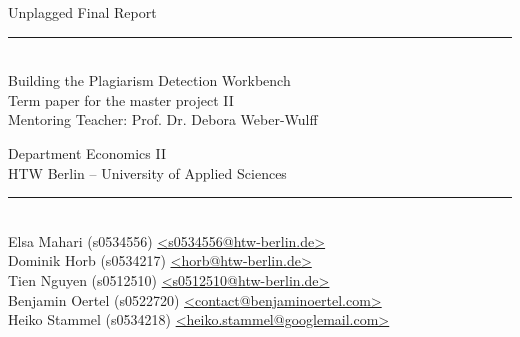 \begin{titlepage}
\vspace*{2cm}

\begin{center}
\Huge
Unplagged Final Report\\
\large
\vspace{0.5cm}
\rule[3mm]{1cm}{0.05mm}\\
Building the Plagiarism Detection Workbench\\
\normalsize
\vfill
Term paper for the master project II \\ Mentoring Teacher: Prof. Dr. Debora Weber-Wulff\\
\vfill

Department Economics II\\
HTW Berlin -- University of Applied Sciences\\

\rule{8.2cm}{0.2mm}\\
Elsa Mahari (s0534556) \href{mailto:s0534556@htw-berlin.de}{\textless s0534556@htw-berlin.de\textgreater}\\
Dominik Horb (s0534217) \href{mailto:horb@htw-berlin.de}{\textless horb@htw-berlin.de\textgreater}\\
Tien Nguyen (s0512510) \href{mailto:s0512510@htw-berlin.de}{\textless s0512510@htw-berlin.de\textgreater}\\
Benjamin Oertel (s0522720) \href{mailto:contact@benjaminoertel.com}{\textless contact@benjaminoertel.com\textgreater}\\
Heiko Stammel (s0534218) \href{mailto:heiko.stammel@googlemail.com}{\textless heiko.stammel@googlemail.com\textgreater}\\


\end{center}
\end{titlepage}